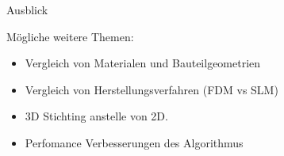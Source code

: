 \documentclass[../slides.tex]{subfiles}
\begin{document}
  \begin{frame}{Ausblick}
    \begin{minipage}[h]{.8\textwidth}
        \begin{block}{Mögliche weitere Themen:}
            \begin{itemize}
                \item Vergleich von Materialen und Bauteilgeometrien
                \item Vergleich von Herstellungsverfahren (FDM vs SLM)
                \item 3D Stichting anstelle von 2D.
                \item Perfomance Verbesserungen des Algorithmus
            \end{itemize}
        \end{block}
    \end{minipage}
    \hfill
    \begin{minipage}[h]{.19\textwidth}       
    \end{minipage}
  \end{frame}
\end{document}

